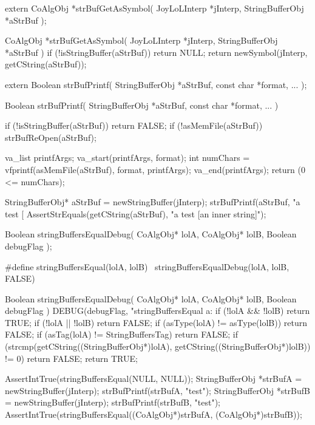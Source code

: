 \startCHeader
extern CoAlgObj *strBufGetAsSymbol(
  JoyLoLInterp    *jInterp,
  StringBufferObj *aStrBuf
);
\stopCHeader

\startCCode
CoAlgObj *strBufGetAsSymbol(
  JoyLoLInterp    *jInterp,
  StringBufferObj *aStrBuf
) {
  if (!isStringBuffer(aStrBuf)) return NULL;
  return newSymbol(jInterp, getCString(aStrBuf));
}
\stopCCode

\stopTestSuite

\startTestSuite[strBufPrintf]

\startCHeader
extern Boolean strBufPrintf(
  StringBufferObj   *aStrBuf,
  const char        *format, 
  ...
);
\stopCHeader

\startCCode
Boolean strBufPrintf(
  StringBufferObj   *aStrBuf,
  const char        *format,
  ...
) {
  if (!isStringBuffer(aStrBuf)) return FALSE;
  if (!asMemFile(aStrBuf)) strBufReOpen(aStrBuf);
  
  va_list printfArgs;
  va_start(printfArgs, format);
  int numChars = vfprintf(asMemFile(aStrBuf), format, printfArgs);
  va_end(printfArgs);
  return (0 <= numChars);
}
\stopCCode

\startCTest
  StringBufferObj* aStrBuf = newStringBuffer(jInterp);
  strBufPrintf(aStrBuf, "a test [%
  AssertStrEquals(getCString(aStrBuf), "a test [an inner string]");
\stopCTest
\stopTestCase
\stopTestSuite


\startCHeader
Boolean stringBuffersEqualDebug(
  CoAlgObj* lolA,
  CoAlgObj* lolB,
  Boolean debugFlag
);

#define stringBuffersEqual(lolA, lolB) \
  stringBuffersEqualDebug(lolA, lolB, FALSE)
\stopCHeader

\startCCode
Boolean stringBuffersEqualDebug(
  CoAlgObj* lolA,
  CoAlgObj* lolB,
  Boolean debugFlag
) {
  DEBUG(debugFlag, "stringBuffersEqual a:%
  if (!lolA && !lolB) return TRUE;
  if (!lolA || !lolB) return FALSE;
  if (asType(lolA) != asType(lolB)) return FALSE;
  if (asTag(lolA)  != StringBuffersTag) return FALSE;
  if (strcmp(getCString((StringBufferObj*)lolA),
    getCString((StringBufferObj*)lolB)) != 0) return FALSE;
  return TRUE;
}
\stopCCode


\startCTest
  AssertIntTrue(stringBuffersEqual(NULL, NULL));
  StringBufferObj *strBufA = newStringBuffer(jInterp);
  strBufPrintf(strBufA, "test");
  StringBufferObj *strBufB = newStringBuffer(jInterp);
  strBufPrintf(strBufB, "test");
  AssertIntTrue(stringBuffersEqual((CoAlgObj*)strBufA, (CoAlgObj*)strBufB));
\stopCTest
\stopTestCase

